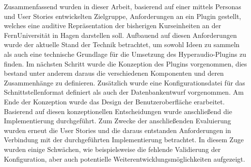 Zusammenfassend wurden in dieser Arbeit, basierend auf einer mittels Personas und User Stories entwickelten Zielgruppe, Anforderungen an ein Plugin gestellt, welches eine auditive Repräsentation der bisherigen Kurseinheiten an der FernUniversität in Hagen darstellen soll. Aufbauend auf diesen Anforderungen wurde der aktuelle Stand der Technik betrachtet, um sowohl Ideen zu sammeln als auch eine technische Grundlage für die Umsetzung des Hyperaudio-Plugins zu finden. Im nächsten Schritt wurde die Konzeption des Plugins vorgenommen, dies bestand unter anderem daraus die verschiedenen Komponenten und deren Zusammenhänge zu definieren. Zusätzlich wurde eine Konfigurationsdatei für das Schnittstellenformat definiert als auch der Datenbankentwurf vorgenommen. Am Ende der Konzeption wurde das Design der Benutzeroberfläche erarbeitet. Basierend auf diesen konzeptionellen Entscheidungen wurde anschließend die Implementierung durchgeführt. Zum Zwecke der anschließenden Evaluierung wurden erneut die User Stories und die daraus entstanden Anforderungen in Verbindung mit der durchgeführten Implementierung betrachtet. In diesem Zuge wurden einige Schwächen, wie beispielsweise die fehlende Validierung der Konfiguration, aber auch potentielle Weiterentwicklungsmöglichkeiten aufgezeigt. 

